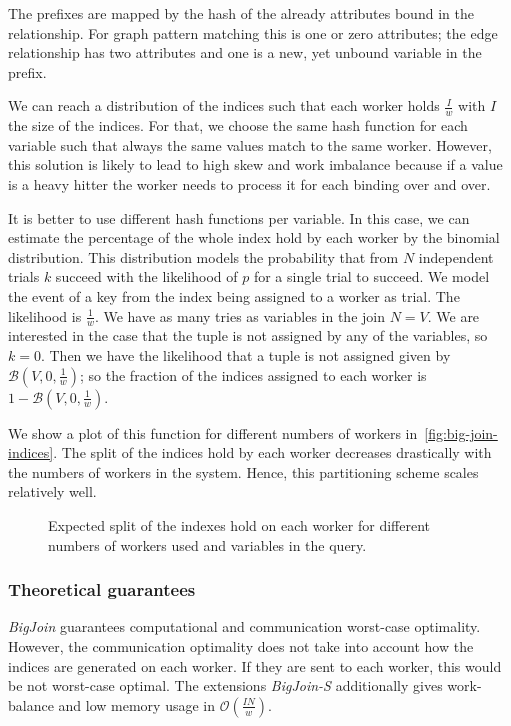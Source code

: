 The prefixes are mapped by the hash of the already attributes bound in the relationship.
For graph pattern matching this is one or zero attributes;
the edge relationship has two attributes and one is a new, yet unbound variable in the prefix.

We can reach a distribution of the indices such that each worker holds $\frac{I}{w}$ with $I$ the size of the indices.
For that, we choose the same hash function for each variable such that always the same values match to the same worker.
However, this solution is likely to lead to high skew and work imbalance because if a value is a heavy hitter the
worker needs to process it for each binding over and over.

It is better to use different hash functions per variable.
In this case, we can estimate the percentage of the whole index hold by each worker by the binomial distribution.
This distribution models the probability that from $N$ independent trials $k$ succeed with the likelihood of $p$ for a single trial
to succeed.
We model the event of a key from the index being assigned to a worker as trial.
The likelihood is $\frac{1}{w}$.
We have as many tries as variables in the join $N = V$.
We are interested in the case that the tuple is not assigned by any of the variables, so $k = 0$.
Then we have the likelihood that a tuple is not assigned given by $\mathcal{B} (V, 0, \frac{1}{w})$;
so the fraction of the indices assigned to each worker is $1 - \mathcal{B} (V, 0, \frac{1}{w})$.

We show a plot of this function for different numbers of workers in~\cref{fig:big-join-indices}.
The split of the indices hold by each worker decreases drastically with the numbers of workers in
the system.
Hence, this partitioning scheme scales relatively well.

\begin{figure}
    \centering
    
    \caption{Expected split of the indexes hold on each worker for different numbers of workers used
      and variables in the query.
    }
\end{figure}

\subsubsection{Theoretical guarantees}
\textit{BigJoin} guarantees computational and communication worst-case optimality.
However, the communication optimality does not take into account how the indices are generated on each worker.
If they are sent to each worker, this would be not worst-case optimal.
The extensions \textit{BigJoin-S} additionally gives work-balance and low memory usage in $\mathcal{O} (\frac{IN}{w})$.

